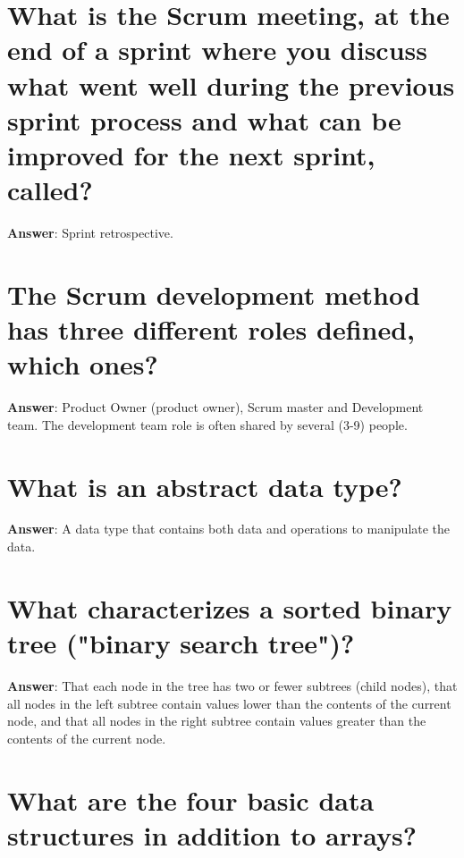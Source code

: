 \documentclass[a4paper,11pt,oneside]{book}
\begin{document}
\begin{sloppypar}
\section{What is the Scrum meeting, at the end of a sprint where you discuss what went well during the previous sprint process and what can be improved for the next sprint, called?}

\label{q:249:sa:en:True}

\textbf{Answer}: Sprint retrospective.



\section{The Scrum development method has three different roles defined, which ones?}

\label{q:250:sa:en:True}

\textbf{Answer}: Product Owner (product owner), Scrum master and Development team. The development team role is often shared by several (3-9) people.



\section{What is an abstract data type?}

\label{q:251:sa:en:True}

\textbf{Answer}: A data type that contains both data and operations to manipulate the data.



\section{What characterizes a sorted binary tree ("binary search tree")?}

\label{q:252:sa:en:True}

\textbf{Answer}: That each node in the tree has two or fewer subtrees (child nodes), that all nodes in the left subtree contain values lower than the contents of the current node, and that all nodes in the right subtree contain values greater than the contents of the current node.



\section{What are the four basic data structures in addition to arrays?}


\end{sloppypar}
\end{document}
